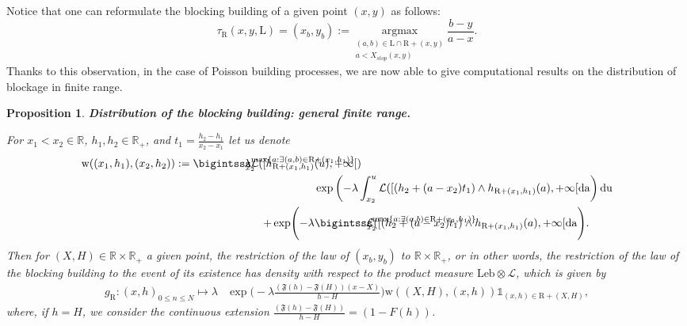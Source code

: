 \documentclass[10pt,english,a4paper]{smfart}
\newtheorem{proposition}{Proposition}[section]
\theoremstyle{definition}
\theoremstyle{remark}
\newcommand{\R}{\mathbb{R}}
\newcommand{\Leb}{\mathrm{Leb}}
\newcommand{\landsc}{\mathrm{L}}
\newcommand{\Half}{\R \times \R_+}
\newcommand{\primi}{\mathfrak{F}}
\newcommand{\placehold}{\mathrm{w}}
\renewcommand{\max}{\text{max}}
\begin{document}
Notice that one can reformulate the blocking building of a given point $(x, y)$ as follows:
\[\tau_{\mathrm{R}} (x, y, \landsc) = (x_b, y_b) := \underset{\substack{(a, b) \in \landsc\cap \mathrm{R}+(x, y) \\a<X_{stop}(x, y)}}{\text{argmax}} \frac{b-y}{a-x}.\]
Thanks to this observation, in the case of Poisson building processes, we are now able to give computational results on the distribution of blockage in finite range.


\begin{proposition}\textbf{Distribution of the blocking building: general finite range.}\label{evo_finite_gen}

For $x_1< x_2\in \R$, $h_1, h_2\in \R_+$, and $t_1 = \frac{h_2-h_1}{x_2-x_1}$ let us denote
\begin{align*}
    \placehold((x_1, h_1), (x_2, h_2)) : =\bigintsss_{\hspace{-5pt}x_2}^{\max\{a : \exists (a, b)\in \mathrm{R}+(x_1, h_1)\}}\hspace{-100pt}\lambda \mathcal{L}([h_{\mathrm{R}+(x_1, h_1)}&(u), +\infty[)\\
&\exp\left(-\lambda \int_{x_2}^{u}\mathcal{L}([(h_2+(a-x_2)t_1)\wedge h_{\mathrm{R}+(x_1, h_1)}(a), +\infty[ \rm{d}a\right)\rm{d}u \\
+ \exp\Biggl(-\lambda&\bigintsss_{\hspace{-5pt}x_2}^{\max\{a : \exists (a, b)\in \mathrm{R}+(x_1, h_1)\}}\hspace{-100pt} \mathcal{L}([(h_2+(a-x_2)t_1)\wedge h_{\mathrm{R}+(x_1, h_1)}(a), +\infty[\rm{d}a\Biggl).
\end{align*}
Then for $(X, H)\in \Half$ a given point, the restriction of the law of $(x_b, y_b)$ to $\Half$, or in other words, the restriction of the law of the blocking building to the event of its existence has density with respect to the product measure $\Leb \otimes \mathcal{L}$, which is given by
\begin{align*}
g_{\mathrm{R}}: (x, h)_{0\leq n\leq N} \mapsto \lambda &\exp\Biggl(-\lambda\frac{(\primi(h)-\primi(H))(x-X)}{h-H}\Biggl) \placehold((X, H), (x, h)) \mathds{1}_{(x, h)\in \mathrm{R}+(X, H)},
\end{align*}
where, if $h=H$, we consider the continuous extension $\frac{(\primi(h)-\primi(H))}{h-H} = (1-F(h))$.
\end{proposition}
\end{document}
